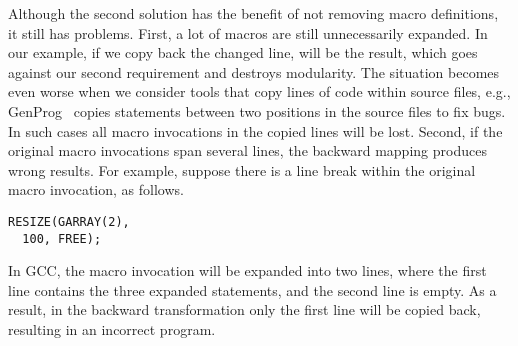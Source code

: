Although the second solution has the benefit of not removing macro
definitions, it still has problems. First, a lot of
macros are still unnecessarily expanded. In our example, if we copy back
the changed line,  will be the result, which goes against our second 
requirement and destroys modularity. The situation becomes even worse when we consider tools that
copy lines of code within source files, e.g.,
GenProg~\cite{le2012genprog} copies statements between two positions
in the source files to fix bugs. In such cases all macro invocations
in the copied lines will be lost. Second, if the original macro
invocations span several lines, the backward mapping produces wrong
results. For example, suppose there is a line break within the
original macro invocation, as follows.
\begin{lstlisting}
RESIZE(GARRAY(2),
  100, FREE);
\end{lstlisting}
In GCC, the macro invocation will be expanded into two lines, where
the first line contains the three expanded statements, and the second
line is empty. As a result, in the backward transformation only the
first line will be copied back, resulting in an incorrect program.



